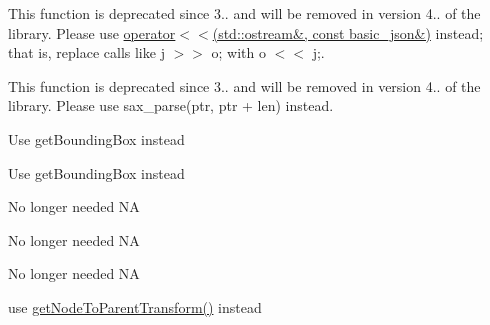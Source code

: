 \begin{DoxyRefList}
\item[\label{deprecated__deprecated000003}%
\Hypertarget{deprecated__deprecated000003}%
Member \hyperlink{classnlohmann_1_1basic__json_a34d6a60dd99e9f33b8273a1c8db5669b}{nlohmann\+:\+:basic\+\_\+json$<$ Object\+Type, Array\+Type, String\+Type, Boolean\+Type, Number\+Integer\+Type, Number\+Unsigned\+Type, Number\+Float\+Type, Allocator\+Type, J\+S\+O\+N\+Serializer, Binary\+Type $>$\+:\+:operator$>$$>$} (const \hyperlink{classnlohmann_1_1basic__json}{basic\+\_\+json} \&j, std\+::ostream \&o)]This function is deprecated since 3.. and will be removed in version 4.. of the library. Please use \hyperlink{classnlohmann_1_1basic__json_a5e34c5435e557d0bf666bd7311211405}{operator$<$$<$(std\+::ostream\&, const basic\+\_\+json\&)} instead; that is, replace calls like {\ttfamily j $>$$>$ o;} with {\ttfamily o $<$$<$ j;}.  
\item[\label{deprecated__deprecated000004}%
\Hypertarget{deprecated__deprecated000004}%
Member \hyperlink{classnlohmann_1_1basic__json_aef9ef0a817ecde8bf270653e8706c150}{nlohmann\+:\+:basic\+\_\+json$<$ Object\+Type, Array\+Type, String\+Type, Boolean\+Type, Number\+Integer\+Type, Number\+Unsigned\+Type, Number\+Float\+Type, Allocator\+Type, J\+S\+O\+N\+Serializer, Binary\+Type $>$\+:\+:sax\+\_\+parse} (\hyperlink{classnlohmann_1_1detail_1_1span__input__adapter}{detail\+::span\+\_\+input\+\_\+adapter} \&\&i, S\+AX $\ast$sax, input\+\_\+format\+\_\+t format=input\+\_\+format\+\_\+t\+::json, const bool strict=true, const bool ignore\+\_\+comments=false)]This function is deprecated since 3.. and will be removed in version 4.. of the library. Please use sax\+\_\+parse(ptr, ptr + len) instead.  
\item[\label{deprecated__deprecated000031}%
\Hypertarget{deprecated__deprecated000031}%
Member \hyperlink{classNode_a7744d16609dfc7609e889129b8672afb}{Node\+:\+:bounding\+Box} () const]Use get\+Bounding\+Box instead 

Use get\+Bounding\+Box instead  
\item[\label{deprecated__deprecated000030}%
\Hypertarget{deprecated__deprecated000030}%
Member \hyperlink{classNode_a4817ce95fa64827e8a58645e5b5854ae}{Node\+:\+:get\+G\+L\+Server\+State} () const]No longer needed  NA 

No longer needed  NA 

No longer needed  NA  
\item[\label{deprecated__deprecated000033}%
\Hypertarget{deprecated__deprecated000033}%
Member \hyperlink{classNode_ab242ac36f0e26f5ef1f89e4a5fa4f02c}{Node\+:\+:node\+To\+Parent\+Transform} () const]use \hyperlink{classNode_a7235b4a4d449fb7e01459c5c3b24d1eb}{get\+Node\+To\+Parent\+Transform()} instead 


\end{DoxyRefList}
